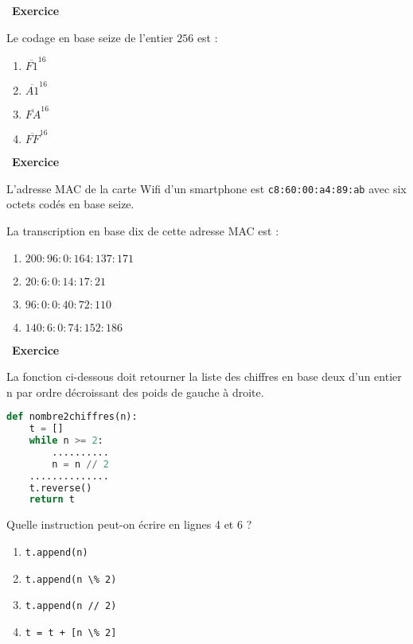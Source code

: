 \documentclass[
  11pt,
]{article}
\newcommand{\passthrough}[1]{#1}
\providecommand{\tightlist}{%
  \setlength{\itemsep}{0pt}\setlength{\parskip}{0pt}}
\newcounter{exo}
\newenvironment{exercice}[1]
{\par \medskip   \addtocounter{exo}{1} \noindent  
\begin{bclogo}[arrondi =0.1,   noborder = true, logo=\bccrayon, marge=4]{~\textbf{Exercice} \textbf{\theexo} {\itshape #1} }  \par}
{
\end{bclogo}
 \par \bigskip }
\newcounter{def}
\begin{document}
\begin{exercice}{}

Le codage en base seize de l'entier \(256\) est :

\begin{enumerate}
\def\labelenumi{\arabic{enumi}.}
\tightlist
\item
  \(\overline{F1}^{16}\)
\item
  \(\overline{A1}^{16}\)
\item
  \(\overline{FA}^{16}\)
\item
  \(\overline{FF}^{16}\)
\end{enumerate}

\end{exercice}

\begin{exercice}{}

L'adresse MAC de la carte Wifi d'un smartphone est
\texttt{c8:60:00:a4:89:ab} avec six octets codés en base seize.

La transcription en base dix de cette adresse MAC est :

\begin{enumerate}
\def\labelenumi{\arabic{enumi}.}
\tightlist
\item
  \(200:96:0:164:137:171\)
\item
  \(20:6:0:14:17:21\)
\item
  \(96:0:0:40:72:110\)
\item
  \(140:6:0:74:152:186\)
\end{enumerate}

\end{exercice}

\begin{exercice}{}

La fonction ci-dessous doit retourner la liste des chiffres en base deux
d'un entier n par ordre décroissant des poids de gauche à droite.

\begin{lstlisting}[language=Python]
def nombre2chiffres(n):
    t = []
    while n >= 2:
        ..........
        n = n // 2
    ..............
    t.reverse()
    return t
\end{lstlisting}

Quelle instruction peut-on écrire en lignes 4 et 6 ?

\begin{enumerate}
\def\labelenumi{\arabic{enumi}.}
\tightlist
\item
  \passthrough{\lstinline!t.append(n)!}
\item
  \passthrough{\lstinline!t.append(n \% 2)!}
\item
  \passthrough{\lstinline!t.append(n // 2)!}
\item
  \passthrough{\lstinline!t = t + [n \% 2]!}
\end{enumerate}

\end{exercice}
\end{document}
